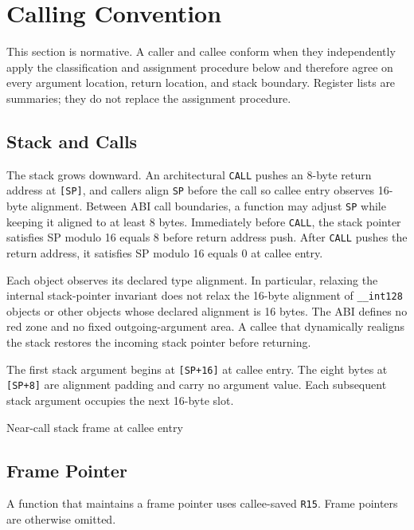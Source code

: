 \documentclass[10pt,twoside]{article}
\begin{document}
\section{Calling Convention}\label{page:calling-convention}
This section is normative. A caller and callee conform when they independently
apply the classification and assignment procedure below and therefore agree on
every argument location, return location, and stack boundary. Register lists
are summaries; they do not replace the assignment procedure.

\subsection{Stack and Calls}
The stack grows downward. An architectural \texttt{CALL} pushes an
8-byte return address at \texttt{[SP]}, and
callers align \texttt{SP} before the call so callee entry observes
16-byte alignment. Between ABI call boundaries, a function
may adjust \texttt{SP} while keeping it aligned to at least
8 bytes. Immediately before \texttt{CALL}, the stack
pointer satisfies SP modulo 16 equals 8 before return address push. After \texttt{CALL} pushes the
return address, it satisfies SP modulo 16 equals 0 at callee entry.

Each object observes its declared type alignment. In particular, relaxing
the internal stack-pointer invariant does not relax the 16-byte alignment of
\texttt{\_\_int128} objects or other objects whose declared alignment is 16
bytes. The ABI defines no red zone and no fixed outgoing-argument area. A
callee that dynamically realigns the stack restores the incoming stack
pointer before returning.

The first stack argument begins at \texttt{[SP+16]} at callee entry. The eight
bytes at \texttt{[SP+8]} are alignment padding and carry no argument value.
Each subsequent stack argument occupies the next 16-byte slot.

\begin{manuallistedstackframediagram}{Near-call stack frame at callee entry}
\end{manuallistedstackframediagram}

\subsection{Frame Pointer}
A function that maintains a frame pointer uses callee-saved \texttt{R15}.
Frame pointers are otherwise omitted.
\end{document}
